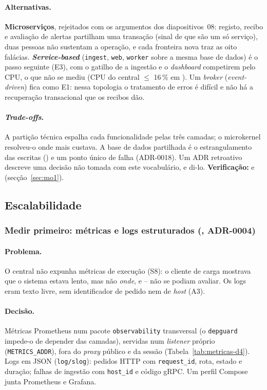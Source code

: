 \paragraph{Alternativas.}
\textbf{Microserviços}, rejeitados com os argumentos dos diapositivos~08: registo, recibo e avaliação de alertas
partilham uma transação (sinal de que são um só serviço), duas pessoas não sustentam a operação, e cada fronteira
nova traz as oito falácias. \textbf{\emph{Service-based}} (\texttt{ingest}, \texttt{web}, \texttt{worker} sobre a
mesma base de dados) é o passo seguinte (E3), com o gatilho de a ingestão e o \emph{dashboard} competirem pelo CPU,
o que não se mediu (CPU do central $\le$ 16\,\% em ). Um \emph{broker} (\emph{event-driven}) fica como
E1: nessa topologia o tratamento de erros é difícil e não há a recuperação transacional que os recibos dão.

\paragraph{\emph{Trade-offs}.}
A partição técnica espalha cada funcionalidade pelas três camadas; o microkernel resolveu-o onde mais custava. A
base de dados partilhada é o estrangulamento das escritas () e um ponto único de falha (ADR-0018). Um ADR
retroativo descreve uma decisão não tomada com este vocabulário, e di-lo. \textbf{Verificação:}  e
 (secção~\ref{sec:mo1}).

\subsection{Escalabilidade}

\subsubsection{Medir primeiro: métricas e logs estruturados (, ADR-0004)}
\label{sec:d4}

\paragraph{Problema.}
O central não expunha métricas de execução (S8): o cliente de carga mostrava que o sistema estava lento, mas não
\emph{onde}, e -- não se podiam avaliar. Os logs eram texto livre, sem identificador de pedido nem
de \emph{host} (A3).

\paragraph{Decisão.}
Métricas Prometheus num pacote \texttt{observability} transversal (o \texttt{depguard} impede-o de depender das
camadas), servidas num \emph{listener} próprio (\texttt{METRICS\_ADDR}), fora do \emph{proxy} público e da sessão
(Tabela~\ref{tab:metricas-d4}). Logs em JSON (\texttt{log/slog}): pedidos HTTP com \texttt{request\_id}, rota,
estado e duração; falhas de ingestão com \texttt{host\_id} e código gRPC. Um perfil Compose junta Prometheus e
Grafana.


